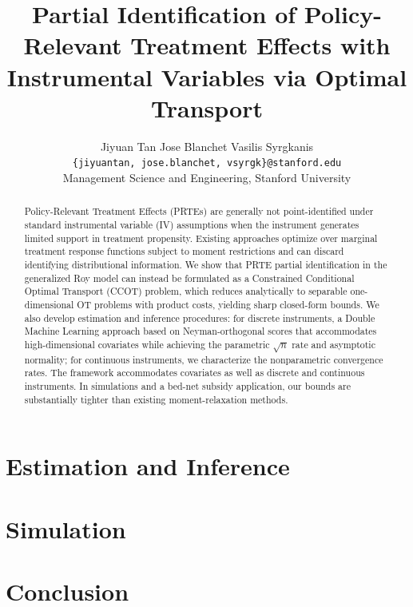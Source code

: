 ﻿\documentclass[12pt]{article}
\title{Partial Identification of Policy-Relevant Treatment Effects with Instrumental Variables via Optimal Transport}
\author{Jiyuan Tan \quad Jose Blanchet \quad Vasilis Syrgkanis \\ \texttt{\{jiyuantan, jose.blanchet, vsyrgk\}@stanford.edu} \\ Management Science and Engineering, Stanford University}
\theoremstyle{plain}
\theoremstyle{definition}
\theoremstyle{remark}
\begin{document}
\maketitle


\begin{abstract}
    Policy-Relevant Treatment Effects (PRTEs) are generally not point-identified under standard instrumental variable (IV) assumptions when the instrument generates limited support in treatment propensity. Existing approaches optimize over marginal treatment response functions subject to moment restrictions and can discard identifying distributional information. We show that PRTE partial identification in the generalized Roy model can instead be formulated as a Constrained Conditional Optimal Transport (CCOT) problem, which reduces analytically to separable one-dimensional OT problems with product costs, yielding sharp closed-form bounds. We also develop estimation and inference procedures: for discrete instruments, a Double Machine Learning approach based on Neyman-orthogonal scores that accommodates high-dimensional covariates while achieving the parametric $\sqrt{n}$ rate and asymptotic normality; for continuous instruments, we characterize the nonparametric convergence rates. The framework accommodates covariates as well as discrete and continuous instruments. In simulations and a bed-net subsidy application, our bounds are substantially tighter than existing moment-relaxation methods.
\end{abstract}










\section{Estimation and Inference}\label{sec:est_inf}




\section{Simulation}\label{sec:simulation}



\section{Conclusion}\label{sec:conclusion}

\end{document}
